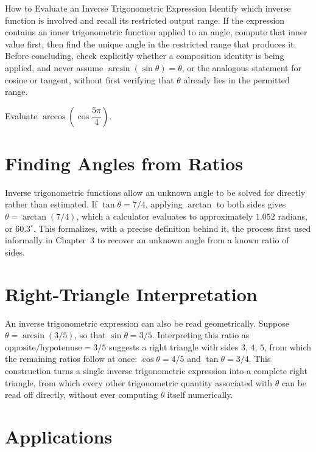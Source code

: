 \begin{algorithmproc}{How to Evaluate an Inverse Trigonometric Expression}
Identify which inverse function is involved and recall its restricted
output range. If the expression contains an inner trigonometric function
applied to an angle, compute that inner value first, then find the unique
angle in the restricted range that produces it. Before concluding, check
explicitly whether a composition identity is being applied, and never
assume $\arcsin(\sin\theta) = \theta$, or the analogous statement for cosine
or tangent, without first verifying that $\theta$ already lies in the
permitted range.
\end{algorithmproc}

\begin{practicenow}
Evaluate $\arccos\left(\cos\dfrac{5\pi}{4}\right)$.
\end{practicenow}

\section{Finding Angles from Ratios}

Inverse trigonometric functions allow an unknown angle to be solved for
directly rather than estimated. If $\tan\theta = 7/4$, applying $\arctan$
to both sides gives $\theta = \arctan(7/4)$, which a calculator evaluates
to approximately $1.052$ radians, or $60.3^\circ$. This formalizes, with a
precise definition behind it, the process first used informally in
Chapter~3 to recover an unknown angle from a known ratio of sides.

\section{Right-Triangle Interpretation}

An inverse trigonometric expression can also be read geometrically. Suppose
$\theta = \arcsin(3/5)$, so that $\sin\theta = 3/5$. Interpreting this
ratio as $\text{opposite}/\text{hypotenuse} = 3/5$ suggests a right
triangle with sides $3$, $4$, $5$, from which the remaining ratios follow
at once: $\cos\theta = 4/5$ and $\tan\theta = 3/4$. This construction turns
a single inverse trigonometric expression into a complete right triangle,
from which every other trigonometric quantity associated with $\theta$ can
be read off directly, without ever computing $\theta$ itself numerically.

\section{Applications}

